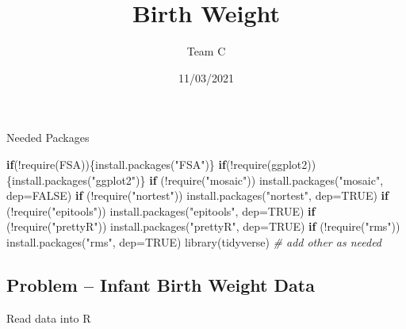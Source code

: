 \documentclass[
]{article}
\title{Birth Weight}
\author{Team C}
\date{11/03/2021}
\newenvironment{Shaded}{\begin{snugshade}}{\end{snugshade}}
\newcommand{\AttributeTok}[1]{\textcolor[rgb]{0.77,0.63,0.00}{#1}}
\newcommand{\CommentTok}[1]{\textcolor[rgb]{0.56,0.35,0.01}{\textit{#1}}}
\newcommand{\ConstantTok}[1]{\textcolor[rgb]{0.00,0.00,0.00}{#1}}
\newcommand{\ControlFlowTok}[1]{\textcolor[rgb]{0.13,0.29,0.53}{\textbf{#1}}}
\newcommand{\FunctionTok}[1]{\textcolor[rgb]{0.00,0.00,0.00}{#1}}
\newcommand{\NormalTok}[1]{#1}
\newcommand{\SpecialCharTok}[1]{\textcolor[rgb]{0.00,0.00,0.00}{#1}}
\newcommand{\StringTok}[1]{\textcolor[rgb]{0.31,0.60,0.02}{#1}}
\begin{document}
\maketitle

Needed Packages

\begin{Shaded}
\begin{Highlighting}[]
\ControlFlowTok{if}\NormalTok{(}\SpecialCharTok{!}\FunctionTok{require}\NormalTok{(FSA))\{}\FunctionTok{install.packages}\NormalTok{(}\StringTok{"FSA"}\NormalTok{)\}}
\ControlFlowTok{if}\NormalTok{(}\SpecialCharTok{!}\FunctionTok{require}\NormalTok{(ggplot2))\{}\FunctionTok{install.packages}\NormalTok{(}\StringTok{"ggplot2"}\NormalTok{)\}}
\ControlFlowTok{if}\NormalTok{ (}\SpecialCharTok{!}\FunctionTok{require}\NormalTok{(}\StringTok{"mosaic"}\NormalTok{)) }\FunctionTok{install.packages}\NormalTok{(}\StringTok{"mosaic"}\NormalTok{, }\AttributeTok{dep=}\ConstantTok{FALSE}\NormalTok{)}
\ControlFlowTok{if}\NormalTok{ (}\SpecialCharTok{!}\FunctionTok{require}\NormalTok{(}\StringTok{"nortest"}\NormalTok{)) }\FunctionTok{install.packages}\NormalTok{(}\StringTok{"nortest"}\NormalTok{, }\AttributeTok{dep=}\ConstantTok{TRUE}\NormalTok{)}
\ControlFlowTok{if}\NormalTok{ (}\SpecialCharTok{!}\FunctionTok{require}\NormalTok{(}\StringTok{"epitools"}\NormalTok{)) }\FunctionTok{install.packages}\NormalTok{(}\StringTok{"epitools"}\NormalTok{, }\AttributeTok{dep=}\ConstantTok{TRUE}\NormalTok{)}
\ControlFlowTok{if}\NormalTok{ (}\SpecialCharTok{!}\FunctionTok{require}\NormalTok{(}\StringTok{"prettyR"}\NormalTok{)) }\FunctionTok{install.packages}\NormalTok{(}\StringTok{"prettyR"}\NormalTok{, }\AttributeTok{dep=}\ConstantTok{TRUE}\NormalTok{)}
\ControlFlowTok{if}\NormalTok{ (}\SpecialCharTok{!}\FunctionTok{require}\NormalTok{(}\StringTok{"rms"}\NormalTok{)) }\FunctionTok{install.packages}\NormalTok{(}\StringTok{"rms"}\NormalTok{, }\AttributeTok{dep=}\ConstantTok{TRUE}\NormalTok{)}
\FunctionTok{library}\NormalTok{(tidyverse)}
\CommentTok{\# add other as needed}
\end{Highlighting}
\end{Shaded}

\hypertarget{problem-infant-birth-weight-data}{%
\subsection{Problem -- Infant Birth Weight
Data}\label{problem-infant-birth-weight-data}}

Read data into R
\end{document}

